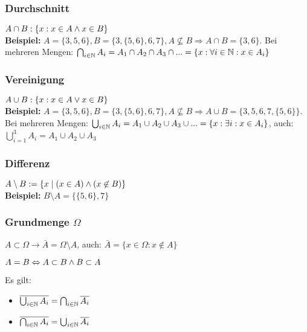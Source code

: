 \subsubsection{Durchschnitt}
$A\cap B : \{x : x \in A \wedge x\in B \}$\\
\textbf{Beispiel:} $A=\{3,5,6\}, B=\{3,\{5,6\},6,7\}, A\nsubseteq B \Rightarrow A\cap B=\{3,6\}$. Bei mehreren Mengen: $\bigcap_{i\in \mathbb{N}} A_i=A_1\cap A_2\cap A_3\cap ... = \{x : \forall i \in \mathbb{N}:x\in A_i\}$

\subsubsection{Vereinigung}
$A\cup B : \{x : x \in A \vee x\in B \}$\\
\textbf{Beispiel:} $A=\{3,5,6\}, B=\{3,\{5,6\},6,7\}, A\nsubseteq B \Rightarrow A\cup B=\{3,5,6,7,\{5,6\}\}$. Bei mehreren Mengen: $\bigcup_{i\in \mathbb{N}} A_i=A_1\cup A_2\cup A_3\cup ... = \{x : \exists i : x\in A_i\}$, auch: $\bigcup_{i=1}^3 A_i=A_1 \cup A_2 \cup A_3$

\subsubsection{Differenz}
$A \setminus B := \{ x \mid \left( x\in A \right) \wedge \left( x\not\in B \right) \}$\\
\textbf{Beispiel:} $B\setminus A=\{\{5,6\},7\}$

\subsubsection{Grundmenge $ \Omega $ }
$A \subset \Omega \rightarrow \bar A=\Omega \setminus A$, auch: $\bar A=\{x \in \Omega:x\notin A\}$

\begin{satz}
$A=B \Leftrightarrow A\subset B \wedge B\subset A$
\end{satz}

\begin{satz}
Es gilt:
\begin{itemize}
\item $\overline{\bigcup_{i\in \mathbb{N}}A_i}=\bigcap_{i\in \mathbb{N}} \overline{A_i}$
\item $\overline{\bigcap_{i\in \mathbb{N}}A_i}=\bigcup_{i\in \mathbb{N}} \overline{A_i}$
\end{itemize}
\end{satz}

